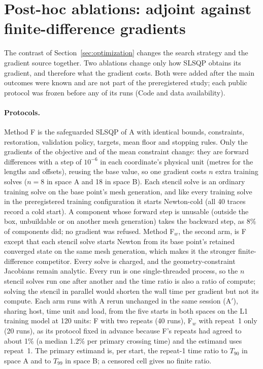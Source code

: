 \section{Post-hoc ablations: adjoint against finite-difference gradients}\label{sec:exp2-fd}
The contrast of Section~\ref{sec:optimization} changes the search strategy
and the gradient source together. Two ablations change only how SLSQP
obtains its gradient, and therefore what the gradient costs. Both were
added after the main outcomes were known and are not part of the
preregistered study; each public protocol was frozen before any of its
runs (Code and data availability).

\paragraph{Protocols.}
Method F is the safeguarded SLSQP of A with identical bounds, constraints,
restoration, validation policy, targets, mean floor and stopping rules.
Only the gradients of the objective and of the mean constraint change: they
are forward differences with a step of $10^{-6}$ in each coordinate's
physical unit (metres for the lengths and offsets), reusing the base value,
so one gradient costs $n$ extra training solves ($n=8$ in space A and 18 in
space B). Each stencil solve is an ordinary training solve on the base
point's mesh generation, and like every training solve in the
preregistered training configuration it starts Newton-cold (all 40 traces
record a cold start). A component whose forward step is unusable
(outside the box, unbuildable or on another mesh generation) takes the
backward step, as 8\% of components did; no gradient was refused. Method
F$_w$, the second arm, is F except that each stencil solve starts Newton
from its base point's retained converged state on the same mesh generation,
which makes it the stronger finite-difference competitor. Every solve is
charged, and the geometry-constraint Jacobians remain analytic. Every run is
one single-threaded process, so the $n$ stencil solves run one after
another and the time ratio is also a ratio of compute; solving the stencil
in parallel would shorten the wall time per gradient but not its compute.
Each arm runs with A rerun unchanged in the same session (A$'$), sharing
host, time unit and load, from the five starts in both spaces on the L1
training model at 120 units: F with two repeats (40 runs), F$_w$ with
repeat~1 only (20 runs), as its protocol fixed in advance because F's
repeats had agreed to about 1\% (a median 1.2\% per primary crossing time)
and the estimand uses repeat~1. The primary estimand is, per start, the repeat-1
time ratio to $T_{90}$ in space A and to $T_{99}$ in space B; a censored
cell gives no finite ratio.

